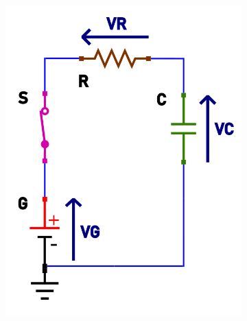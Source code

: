 \documentclass[12pt]{article}
\begin{document}
\begin{figure}[h!]
\begin{subfigure}[b]{0.347\linewidth}
    \includegraphics[width=\linewidth]{data/carica-tensioni.png}
  \end{subfigure}
\end{figure}
\end{document}
